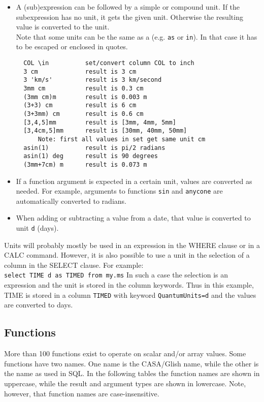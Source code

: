 \begin{itemize}
 \item A (sub)expression can be followed by a simple or compound unit.
       If the subexpression has no unit, it gets the given unit.
       Otherwise the resulting value is converted to the unit.
       \\Note that some units can be the same as a
       (e.g. \texttt{as} or \texttt{in}).
       In that case it has to be escaped or enclosed in quotes.
\begin{verbatim}
  COL \in          set/convert column COL to inch
  3 cm             result is 3 cm
  3 'km/s'         result is 3 km/second
  3mm cm           result is 0.3 cm
  (3mm cm)m        result is 0.003 m
  (3+3) cm         result is 6 cm
  (3+3mm) cm       result is 0.6 cm
  [3,4,5]mm        result is [3mm, 4mm, 5mm]
  [3,4cm,5]mm      result is [30mm, 40mm, 50mm]
      Note: first all values in set get same unit cm
  asin(1)          result is pi/2 radians
  asin(1) deg      result is 90 degrees
  (3mm+7cm) m      result is 0.073 m
\end{verbatim}
 \item If a function argument is expected in a certain unit, values
	are converted as needed. For example, arguments to functions 
	\texttt{sin} and \texttt{anycone}
	are automatically converted to radians.
 \item When adding or subtracting a value from a date, that value is
	converted to unit \texttt{d} (days).
\end{itemize}
Units will probably mostly be used in an expression in the WHERE
clause or in a CALC command. However, it is also possible to use a
unit in the selection of a column in the SELECT clause. For example:
\\\texttt{select TIME d as TIMED from my.ms}
In such a case the selection is an expression and the unit is stored
in the column keywords. Thus in this example, TIME is stored in a
column \texttt{TIMED} with keyword \texttt{QuantumUnits=d} and the 
values are converted to days.

\subsection{\label{TAQL:FUNCTIONS}Functions}
More than 100 functions exist to operate on scalar and/or array values.
Some functions have two names. One name is the CASA/Glish name, while the
other is the name as used in SQL.
In the following tables the function names are shown in uppercase,
while the result and argument types are shown in lowercase.
Note, however, that function names are case-insensitive.

